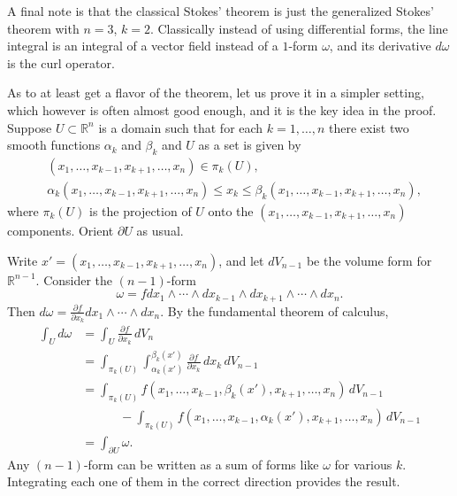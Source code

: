 \documentclass[12pt,openany]{book}
\newcommand{\R}{{\mathbb{R}}}
\theoremstyle{plain}
\theoremstyle{remark}
\theoremstyle{definition}
\theoremstyle{exercise}
\theoremstyle{example}
\begin{document}
A final note is that the classical Stokes' theorem is just the generalized
Stokes' theorem with $n=3$, $k=2$.  Classically instead of
using differential forms, the line integral is an integral of a vector field
instead of a $1$-form
$\omega$, and its derivative $d\omega$ is the curl operator.

As to at least get a flavor of the theorem, let us prove it in a simpler
setting, which however is often almost good enough, and it is the key idea
in the proof.
Suppose $U \subset \R^n$ is a domain such that for each $k=1,\ldots,n$
there exist two smooth functions $\alpha_k$ and $\beta_k$ and $U$
as a set is given by
\begin{equation*}
\begin{aligned}
& (x_1,\ldots,x_{k-1},x_{k+1},\ldots,x_n) \in \pi_k(U) ,
\\
& \alpha_k(x_1,\ldots,x_{k-1},x_{k+1},\ldots,x_n)
\leq x_k \leq
\beta_k(x_1,\ldots,x_{k-1},x_{k+1},\ldots,x_n) ,
\end{aligned}
\end{equation*}
where $\pi_k(U)$ is the projection of $U$ onto the
$(x_1,\ldots,x_{k-1},x_{k+1},\ldots,x_n)$ components.
Orient $\partial U$ as usual.

Write $x' = (x_1,\ldots,x_{k-1},x_{k+1},\ldots,x_n)$, and let $dV_{n-1}$ be the
volume form for $\R^{n-1}$.
Consider the $(n-1)$-form
\begin{equation*}
\omega = f
dx_1 \wedge \cdots \wedge dx_{k-1} \wedge dx_{k+1} \wedge \cdots \wedge dx_n
.
\end{equation*}
Then $d\omega = \frac{\partial f}{\partial x_k} dx_1 \wedge \cdots \wedge
dx_n$.
By the fundamental theorem of
calculus,
\begin{equation*}
\begin{split}
\int_U d\omega &=
\int_U \frac{\partial f}{\partial x_k} \, dV_n
\\
& =
\int_{\pi_k(U)}
\int_{\alpha_k(x')}^{\beta_k(x')}
\frac{\partial f}{\partial x_k} \, dx_k \, dV_{n-1}
\\
& =
\int_{\pi_k(U)}
f(x_1,\ldots,x_{k-1}, \beta_k(x'), x_{k+1}, \ldots, x_n)
\,dV_{n-1}
\\
& \phantom{=xxx}
-
\int_{\pi_k(U)}
f(x_1,\ldots,x_{k-1}, \alpha_k(x'), x_{k+1}, \ldots, x_n)
\,dV_{n-1}
\\
& =
\int_{\partial U} \omega .
\end{split}
\end{equation*}
Any $(n-1)$-form can be written as a sum of forms like $\omega$ for various
$k$.  Integrating each one of them in the correct direction provides the
result.
\end{document}
